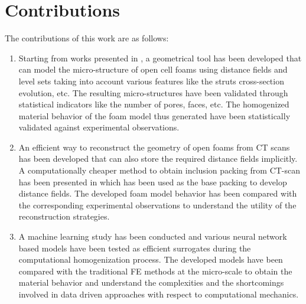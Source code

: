 \section{Contributions}

The contributions of this work are as follows:
\begin{enumerate}
	\item Starting from works presented in \cite{sononAdvancedApproachGeneration2015}, a geometrical tool has been developed that can model the micro-structure of open cell foams using distance fields and level sets taking into account various features like the struts cross-section evolution, etc.  The resulting micro-structures have been validated through statistical indicators like the number of pores, faces, etc. The homogenized material behavior of the foam model thus generated have been statistically validated against experimental observations. 
	\item An efficient way to reconstruct the geometry of open foams from CT scans has been developed that can also store the required distance fields implicitly. A computationally cheaper method to obtain inclusion packing from CT-scan has been presented in \cite{leblancAnalysisOpenFoamUnderPreparation} which has been used as the base packing to develop distance fields.  The developed foam model behavior has been compared with the corresponding experimental observations to understand the utility of the reconstruction strategies. 
	\item A machine learning study has been conducted and various neural network based models have been tested as efficient surrogates during the computational homogenization process.  The developed models have been compared with the traditional FE methods at the micro-scale to obtain the material behavior and understand the complexities and the shortcomings involved in data driven approaches with respect to computational mechanics.
\end{enumerate}


